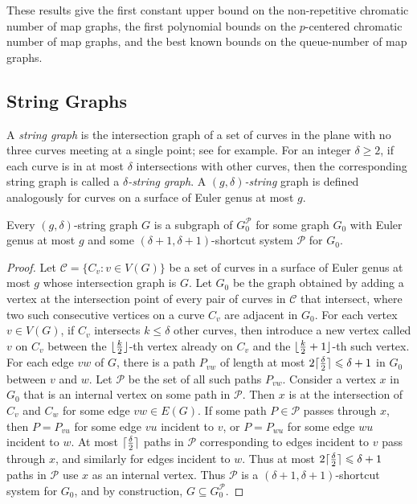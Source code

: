 \documentclass{patmorin}
\DeclarePairedDelimiter{\ceil}{\lceil}{\rceil}
\DeclarePairedDelimiter{\floor}{\lfloor}{\rfloor}
\newcommand{\PP}{\mathcal{P}}
\renewcommand{\geq}{\geqslant}
\renewcommand{\leq}{\leqslant}
\begin{document}
These results give 
the first constant upper bound on the non-repetitive chromatic number of map graphs,  
the first polynomial bounds on the $p$-centered chromatic number of map graphs, and
the best known bounds on the queue-number of map graphs.

\subsection{String Graphs}

A \emph{string graph} is the intersection graph of a set of curves in the plane with no three curves meeting at a single point; see  \cite{PachToth-DCG02,FP10,FP14} for example. For an integer $\delta\geq 2$, if each curve is in at most $\delta$ intersections with other curves, then the corresponding string graph is called a \emph{$\delta$-string graph}. A \emph{$(g,\delta)$-string} graph is defined analogously for curves on a surface of Euler genus at most $g$.

\begin{lem}
\label{StringShortcut}
Every $(g,\delta)$-string graph $G$ is a subgraph of $G_0^\PP$ for some graph $G_0$ with Euler genus at most $g$ and some $(\delta+1,\delta+1 )$-shortcut system $\PP$ for $G_0$.
\end{lem}

\begin{proof}
Let $\mathcal{C}=\{C_v:v\in V(G)\}$ be a set of curves in a surface of Euler genus at most $g$ whose intersection graph is $G$.  Let $G_0$ be the graph obtained by adding a vertex at the intersection point of every pair of curves in $\mathcal{C}$ that intersect,  where two such consecutive vertices on a curve $C_v$ are adjacent in $G_0$. For each vertex $v\in V(G)$, if $C_v$ intersects $k\leq\delta$ other curves, then introduce a new vertex called $v$ on $C_v$ between the
$\floor{\frac{k}{2}}$-th vertex already on $C_v$ and the $\floor{\frac{k}{2}+1}$-th such vertex. For each edge $vw$ of $G$, there is a path $P_{vw}$ of length at most $2\ceil{\frac{\delta}{2}}\leq \delta+1$ in $G_0$ between $v$ and $w$. Let $\PP$ be the set of all such paths $P_{vw}$. Consider a vertex $x$ in $G_0$ that is an internal vertex on some path in $\PP$. Then $x$ is at the intersection of $C_v$ and $C_w$ for some edge $vw\in E(G)$. If some path $P\in \PP$ passes through $x$, then $P=P_{vu}$ for some edge $vu$ incident to $v$, or $P=P_{wu}$ for some edge $wu$ incident to $w$. At most $\ceil{\frac{\delta}{2}}$ paths in $\PP$ corresponding to edges incident to $v$ pass through $x$, and similarly for edges incident to $w$. Thus at most $2\ceil{\frac{\delta}{2}}\leq\delta+1$ paths in $\PP$ use $x$ as an internal vertex. Thus $\PP$ is a $(\delta+1,\delta+1)$-shortcut system for $G_0$, and by construction, $G \subseteq G_0^\PP$.
\end{proof}
\end{document}
